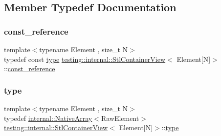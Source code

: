 \subsection{Member Typedef Documentation}
\mbox{\label{classtesting_1_1internal_1_1StlContainerView_3_01Element[N]_4_a481e6ab99316939484fad9c561af5e28}} 
\subsubsection{\texorpdfstring{const\_reference}{const\_reference}}
{\footnotesize\ttfamily template$<$typename Element , size\+\_\+t N$>$ \\
typedef const \mbox{\hyperlink{classtesting_1_1internal_1_1StlContainerView_3_01Element[N]_4_a364efca99cc5a02829b4e3413c506b09}{type}} \mbox{\hyperlink{classtesting_1_1internal_1_1StlContainerView}{testing\+::internal\+::\+Stl\+Container\+View}}$<$ Element\mbox{[}N\mbox{]}$>$\+::\mbox{\hyperlink{classtesting_1_1internal_1_1StlContainerView_3_01Element[N]_4_a481e6ab99316939484fad9c561af5e28}{const\+\_\+reference}}}

\mbox{\label{classtesting_1_1internal_1_1StlContainerView_3_01Element[N]_4_a364efca99cc5a02829b4e3413c506b09}} 
\subsubsection{\texorpdfstring{type}{type}}
{\footnotesize\ttfamily template$<$typename Element , size\+\_\+t N$>$ \\
typedef \mbox{\hyperlink{classtesting_1_1internal_1_1NativeArray}{internal\+::\+Native\+Array}}$<$Raw\+Element$>$ \mbox{\hyperlink{classtesting_1_1internal_1_1StlContainerView}{testing\+::internal\+::\+Stl\+Container\+View}}$<$ Element\mbox{[}N\mbox{]}$>$\+::\mbox{\hyperlink{classtesting_1_1internal_1_1StlContainerView_3_01Element[N]_4_a364efca99cc5a02829b4e3413c506b09}{type}}}



